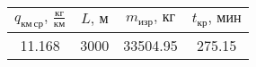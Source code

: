 \begin{tabular}{|c|c|c|c|}
\hline
$q_{км\, ср},\, \frac{кг}{км}$ & $L,\, м$ & $m_{изр},\, кг$ & $t_{кр},\, мин$ \\ 
\hline
11.168 & 3000 & 33504.95 & 275.15 \\ 
\hline
\end{tabular}